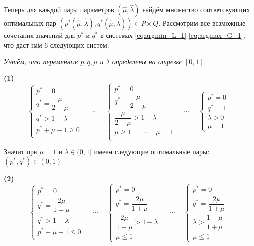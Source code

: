 \hspace{5mm}

Теперь для каждой пары параметров $(\hat \mu, \hat \lambda)$ найдём множество
соответсвующих оптимальных пар 
$(p^*(\hat \mu, \hat \lambda), q^*(\hat \mu, \hat \lambda)) \in P \times Q$. 
Рассмотрим все возможные сочетания значений для $p^*$ и $q^*$ в системах 
\eqref{eq:argmin_L_1} \eqref{eq:argmax_G_1}, что даст нам 6 следующих систем:

\hspace{3mm}

	\textit{Учтём, что переменные $p, q, \mu$ и $\lambda$ определены на отрезке $[0, 1]$.}
	
\textbf{(1)}
$$
	\begin{cases}
		p^* = 0 \\
		q^* = \dfrac{\mu}{2 - \mu} \\
		q^* > 1 - \lambda \\
		p^* + \mu - 1 \geqslant 0 \\
	\end{cases}
	\quad \sim \quad
	\begin{cases}
		p^* = 0 \\
		q^* = \dfrac{\mu}{2 - \mu} \\
		\dfrac{\mu}{2 - \mu} > 1 - \lambda \\
		\mu \geqslant 1 \quad \Rightarrow \quad \mu = 1 \\
	\end{cases}
	\quad \sim \quad
	\begin{cases}
		p^* = 0 \\
		q^* = 1 \\
		\lambda > 0 \\
		\mu = 1
	\end{cases}
$$

Значит при $\mu = 1$  и $\lambda \in (0,1]$ имеем следующие оптимальные пары:
$(p^*, q^*) \in (0, 1)$

\hspace{5mm}

\textbf{(2)}
$$
	\begin{cases}
		p^* = 0 \\
		q^* = \dfrac{2\mu}{1+\mu} \\
		q^* > 1 - \lambda \\
		p^* + \mu - 1 \leqslant 0 \\
	\end{cases}
	\quad \sim \quad
	\begin{cases}
		p^* = 0 \\
		q^* = \dfrac{2\mu}{1+\mu} \\
		\dfrac{2\mu}{1+\mu} > 1 - \lambda \\
		\mu \leqslant 1
	\end{cases}
	\quad \sim \quad
	\begin{cases}
		p^* = 0 \\
		q^* = \dfrac{2\mu}{1+\mu} \\
		\lambda > \dfrac{1-\mu}{1+\mu} \\
		\mu \leqslant 1
	\end{cases}
$$

